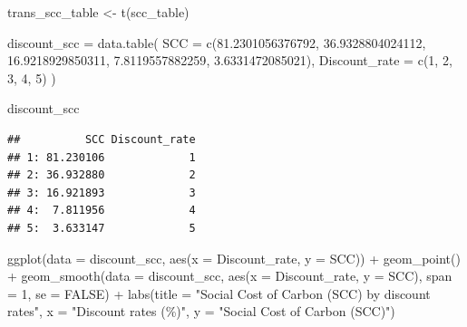 \documentclass[
]{article}
\newenvironment{Shaded}{\begin{snugshade}}{\end{snugshade}}
\newcommand{\AttributeTok}[1]{\textcolor[rgb]{0.77,0.63,0.00}{#1}}
\newcommand{\ConstantTok}[1]{\textcolor[rgb]{0.00,0.00,0.00}{#1}}
\newcommand{\DecValTok}[1]{\textcolor[rgb]{0.00,0.00,0.81}{#1}}
\newcommand{\FloatTok}[1]{\textcolor[rgb]{0.00,0.00,0.81}{#1}}
\newcommand{\FunctionTok}[1]{\textcolor[rgb]{0.00,0.00,0.00}{#1}}
\newcommand{\NormalTok}[1]{#1}
\newcommand{\OtherTok}[1]{\textcolor[rgb]{0.56,0.35,0.01}{#1}}
\newcommand{\SpecialCharTok}[1]{\textcolor[rgb]{0.00,0.00,0.00}{#1}}
\newcommand{\StringTok}[1]{\textcolor[rgb]{0.31,0.60,0.02}{#1}}
\begin{document}
\begin{Shaded}
\begin{Highlighting}[]
\NormalTok{trans\_scc\_table }\OtherTok{\textless{}{-}} \FunctionTok{t}\NormalTok{(scc\_table)}

\NormalTok{discount\_scc }\OtherTok{=} \FunctionTok{data.table}\NormalTok{(}
  \AttributeTok{SCC =} \FunctionTok{c}\NormalTok{(}\FloatTok{81.2301056376792}\NormalTok{, }\FloatTok{36.9328804024112}\NormalTok{, }\FloatTok{16.9218929850311}\NormalTok{, }\FloatTok{7.8119557882259}\NormalTok{, }\FloatTok{3.6331472085021}\NormalTok{),}
  \AttributeTok{Discount\_rate =} \FunctionTok{c}\NormalTok{(}\DecValTok{1}\NormalTok{, }\DecValTok{2}\NormalTok{, }\DecValTok{3}\NormalTok{, }\DecValTok{4}\NormalTok{, }\DecValTok{5}\NormalTok{)}
\NormalTok{)}

\NormalTok{discount\_scc}
\end{Highlighting}
\end{Shaded}

\begin{verbatim}
##          SCC Discount_rate
## 1: 81.230106             1
## 2: 36.932880             2
## 3: 16.921893             3
## 4:  7.811956             4
## 5:  3.633147             5
\end{verbatim}

\begin{Shaded}
\begin{Highlighting}[]
\FunctionTok{ggplot}\NormalTok{(}\AttributeTok{data =}\NormalTok{ discount\_scc, }\FunctionTok{aes}\NormalTok{(}\AttributeTok{x =}\NormalTok{ Discount\_rate, }\AttributeTok{y =}\NormalTok{ SCC)) }\SpecialCharTok{+}
  \FunctionTok{geom\_point}\NormalTok{() }\SpecialCharTok{+}
  \FunctionTok{geom\_smooth}\NormalTok{(}\AttributeTok{data =}\NormalTok{ discount\_scc, }\FunctionTok{aes}\NormalTok{(}\AttributeTok{x =}\NormalTok{ Discount\_rate, }\AttributeTok{y =}\NormalTok{ SCC), }\AttributeTok{span =} \DecValTok{1}\NormalTok{, }\AttributeTok{se =} \ConstantTok{FALSE}\NormalTok{) }\SpecialCharTok{+}
  \FunctionTok{labs}\NormalTok{(}\AttributeTok{title =} \StringTok{"Social Cost of Carbon (SCC) by discount rates"}\NormalTok{, }\AttributeTok{x =} \StringTok{"Discount rates (\%)"}\NormalTok{, }\AttributeTok{y =} \StringTok{"Social Cost of Carbon (SCC)"}\NormalTok{)}
\end{Highlighting}
\end{Shaded}
\end{document}
